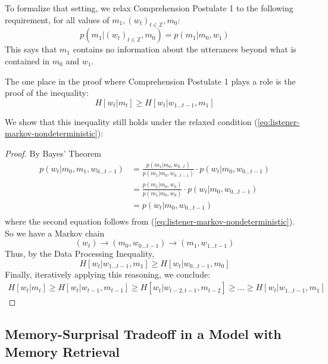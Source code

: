 \documentclass[11pt,letterpaper]{article}
\begin{document}
To formalize that setting, we relax Comprehension Postulate 1 to the following requirement, for all values of $m_1, (w_{t})_{t \in \mathbb{Z}}, m_0$:
\begin{equation}\label{eq:listener-markov-nondeterministic}
p(m_1| (w_{t})_{t \in \mathbb{Z}}, m_0)   = p(m_1 | m_0, w_1)
\end{equation}
This says that $m_1$ contains no information about the utterances beyond what is contained in $m_0$ and $w_1$.	

The one place in the proof where Comprehension Postulate 1 plays a role is the proof of the inequality:
\begin{equation}
	H[w_t | m_t] \geq H[w_t|w_{1 \dots t-1}, m_1]
\end{equation}

We show that this inequality still holds under the relaxed condition (\ref{eq:listener-markov-nondeterministic}):
\begin{proof}
	By Bayes' Theorem
\begin{align*}
	p(w_t|m_0, m_1, w_{0\dots t-1}) &= \frac{p(m_1|m_0, w_{0\dots t})}{p(m_1|m_0, w_{0\dots t-1})} \cdot p(w_t|m_0, w_{0\dots t-1}) \\
 &= \frac{p(m_1|m_0, w_{0})}{p(m_1|m_0, w_{0})} \cdot p(w_t|m_0, w_{0\dots t-1}) \\
 &= p(w_t|m_0, w_{0\dots t-1}) \\
\end{align*}
	where the second equation follows from (\ref{eq:listener-markov-nondeterministic}).
So we have a Markov chain
\begin{equation}
(w_t) \rightarrow (m_0, w_{0 \dots t-1})   \rightarrow   (m_1, w_{1 \dots t-1})
\end{equation}
Thus, by the Data Processing Inequality,
\begin{equation}
H[w_t| w_{1 \dots t-1}, m_{1}] \geq H[w_t|w_{0 \dots t-1}, m_0]
\end{equation}
Finally, iteratively applying this reasoning, we conclude:
\begin{align*}
H[w_t | m_t] \geq H[w_t| w_{t-1}, m_{t-1}] \geq H[w_t| w_{t-2, t-1}, m_{t-2}] \geq ... \geq H[w_t|w_{1 \dots t-1}, m_1]
\end{align*}
\end{proof}


\subsection{Memory-Surprisal Tradeoff in a Model with Memory Retrieval}
\end{document}
